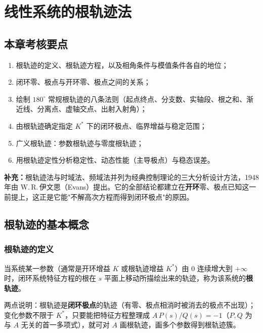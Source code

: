 \chapter{线性系统的根轨迹法}

\setlength{\parskip}{0.8ex plus 0.3ex minus 0.2ex}
\renewcommand{\arraystretch}{1.5}
\setlength{\tabcolsep}{10pt}
\addtolength{\abovedisplayskip}{2pt}
\addtolength{\belowdisplayskip}{2pt}

\bigskip

\section{本章考核要点}
\begin{enumerate}
    \item 根轨迹的定义、根轨迹方程，以及相角条件与模值条件各自的地位；
    \item 闭环零、极点与开环零、极点之间的关系；
    \item 绘制 $180^\circ$ 常规根轨迹的八条法则（起点终点、分支数、实轴段、根之和、渐近线、分离点、虚轴交点、出射入射角）；
    \item 由根轨迹确定指定 $K^*$ 下的闭环极点、临界增益与稳定范围；
    \item 广义根轨迹：参数根轨迹与零度根轨迹；
    \item 用根轨迹定性分析稳定性、动态性能（主导极点）与稳态误差。
\end{enumerate}
\noindent\textbf{补充：}根轨迹法与时域法、频域法并列为经典控制理论的三大分析设计方法，1948 年由 W.\,R.\,伊文思（Evans）提出。它的全部结论都建立在\textbf{开环}零、极点已知这一前提上，这正是它能"不解高次方程而得到闭环极点"的原因。

\medskip

\section{根轨迹的基本概念}
\subsection{根轨迹的定义}
当系统某一参数（通常是开环增益 $K$ 或根轨迹增益 $K^*$）由 $0$ 连续增大到 $+\infty$ 时，闭环系统特征方程的根在 $s$ 平面上移动所描绘出来的轨迹，称为该系统的\textbf{根轨迹}。

两点说明：根轨迹是\textbf{闭环极点}的轨迹（有零、极点相消时被消去的极点不出现）；变化参数不限于 $K^*$，只要能把特征方程整理成 $A\,P(s)/Q(s)=-1$（$P,Q$ 为与 $A$ 无关的首一多项式），就可对 $A$ 画根轨迹，画多个参数得到根轨迹簇。

